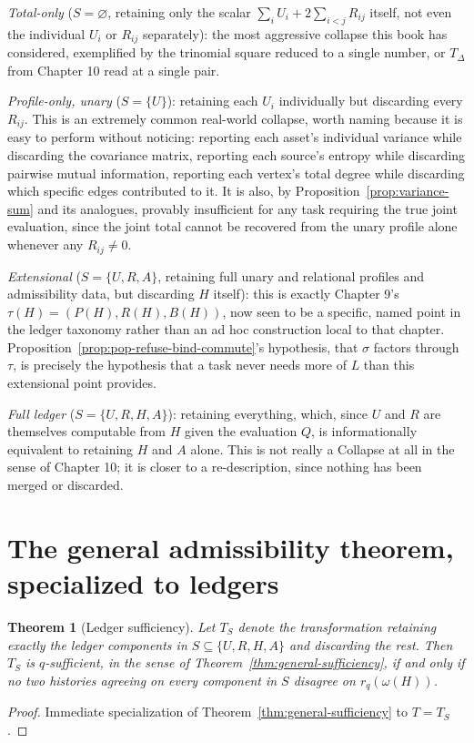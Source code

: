 \documentclass[11pt]{book}
\newtheorem{theorem}{Theorem}[chapter]
\begin{document}
\emph{Total-only} ($S=\varnothing$, retaining only the scalar $\sum_iU_i+2\sum_{i<j}R_{ij}$ itself, not even the individual $U_i$ or $R_{ij}$ separately): the most aggressive collapse this book has considered, exemplified by the trinomial square reduced to a single number, or $T_\Delta$ from Chapter 10 read at a single pair.

\emph{Profile-only, unary} ($S=\{U\}$): retaining each $U_i$ individually but discarding every $R_{ij}$. This is an extremely common real-world collapse, worth naming because it is easy to perform without noticing: reporting each asset's individual variance while discarding the covariance matrix, reporting each source's entropy while discarding pairwise mutual information, reporting each vertex's total degree while discarding which specific edges contributed to it. It is also, by Proposition~\ref{prop:variance-sum} and its analogues, provably insufficient for any task requiring the true joint evaluation, since the joint total cannot be recovered from the unary profile alone whenever any $R_{ij}\ne0$.

\emph{Extensional} ($S=\{U,R,A\}$, retaining full unary and relational profiles and admissibility data, but discarding $H$ itself): this is exactly Chapter 9's $\tau(H)=(P(H),R(H),B(H))$, now seen to be a specific, named point in the ledger taxonomy rather than an ad hoc construction local to that chapter. Proposition~\ref{prop:pop-refuse-bind-commute}'s hypothesis, that $\sigma$ factors through $\tau$, is precisely the hypothesis that a task never needs more of $L$ than this extensional point provides.

\emph{Full ledger} ($S=\{U,R,H,A\}$): retaining everything, which, since $U$ and $R$ are themselves computable from $H$ given the evaluation $Q$, is informationally equivalent to retaining $H$ and $A$ alone. This is not really a Collapse at all in the sense of Chapter 10; it is closer to a re-description, since nothing has been merged or discarded.

\section{The general admissibility theorem, specialized to ledgers}

\begin{theorem}[Ledger sufficiency]
\label{thm:ledger-sufficiency}
Let $T_S$ denote the transformation retaining exactly the ledger components in $S\subseteq\{U,R,H,A\}$ and discarding the rest. Then $T_S$ is $q$-sufficient, in the sense of Theorem~\ref{thm:general-sufficiency}, if and only if no two histories agreeing on every component in $S$ disagree on $r_q(\omega(H))$.
\end{theorem}
\begin{proof}
Immediate specialization of Theorem~\ref{thm:general-sufficiency} to $T=T_S$.
\end{proof}
\end{document}
